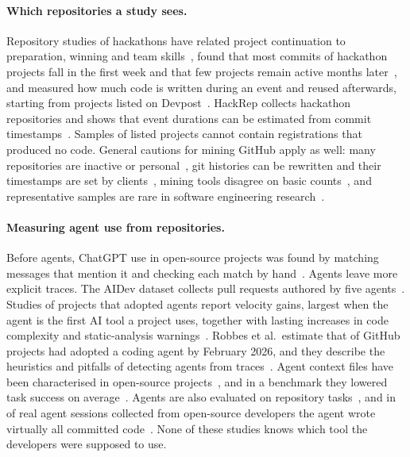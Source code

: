 \documentclass{article}
\begin{document}
\paragraph{Which repositories a study sees.}
Repository studies of hackathons have related project continuation to preparation, winning and team skills~\cite{nolte2020hackathon}, found that most commits of hackathon projects fall in the first week and that few projects remain active months later~\cite{mcintosh2021hackathon}, and measured how much code is written during an event and reused afterwards, starting from \devpostprojects{} projects listed on Devpost~\cite{imam2021secretlife,mahmoud2022oneoff}. HackRep collects \hackrepsize{} hackathon repositories and shows that event durations can be estimated from commit timestamps~\cite{halmans2026hackrep}. Samples of listed projects cannot contain registrations that produced no code. General cautions for mining GitHub apply as well: many repositories are inactive or personal~\cite{kalliamvakou2014perils}, git histories can be rewritten and their timestamps are set by clients~\cite{bird2009git}, mining tools disagree on basic counts~\cite{hoess2025toolmatter}, and representative samples are rare in software engineering research~\cite{baltes2022sampling}.

\paragraph{Measuring agent use from repositories.}
Before agents, ChatGPT use in open-source projects was found by matching messages that mention it and checking each match by hand~\cite{tufano2024chatgpt}. Agents leave more explicit traces. The AIDev dataset collects pull requests authored by five agents~\cite{li2025aidev}. Studies of projects that adopted agents report velocity gains, largest when the agent is the first AI tool a project uses, together with lasting increases in code complexity and static-analysis warnings~\cite{agarwal2026aiides,he2026cursor}. Robbes et al.\ estimate that \robbesrate{} of \robbesprojects{} GitHub projects had adopted a coding agent by February 2026, and they describe the heuristics and pitfalls of detecting agents from traces~\cite{robbes2026agenticmuch,robbes2026heuristics}. Agent context files have been characterised in open-source projects~\cite{chatlatanagulchai2025agentreadmes}, and in a benchmark they lowered task success on average~\cite{gloaguen2026agentsmd}. Agents are also evaluated on repository tasks~\cite{jimenez2023swebench,yang2024sweagent}, and in \swechatshare{} of real agent sessions collected from open-source developers the agent wrote virtually all committed code~\cite{baumann2026swechat}. None of these studies knows which tool the developers were supposed to use.
\end{document}
